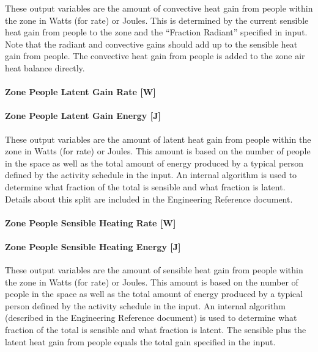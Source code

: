 These output variables are the amount of convective heat gain from people within the zone in Watts (for rate) or Joules. This is determined by the current sensible heat gain from people to the zone and the ``Fraction Radiant'' specified in input. Note that the radiant and convective gains should add up to the sensible heat gain from people. The convective heat gain from people is added to the zone air heat balance directly.

\paragraph{Zone People Latent Gain Rate {[}W{]}}\label{zone-people-latent-gain-rate-w}

\paragraph{Zone People Latent Gain Energy {[}J{]}}\label{zone-people-latent-gain-energy-j}

These output variables are the amount of latent heat gain from people within the zone in Watts (for rate) or Joules. This amount is based on the number of people in the space as well as the total amount of energy produced by a typical person defined by the activity schedule in the input. An internal algorithm is used to determine what fraction of the total is sensible and what fraction is latent. Details about this split are included in the Engineering Reference document.

\paragraph{Zone People Sensible Heating Rate {[}W{]}}\label{zone-people-sensible-heating-rate-w}

\paragraph{Zone People Sensible Heating Energy {[}J{]}}\label{zone-people-sensible-heating-energy-j}

These output variables are the amount of sensible heat gain from people within the zone in Watts (for rate) or Joules. This amount is based on the number of people in the space as well as the total amount of energy produced by a typical person defined by the activity schedule in the input. An internal algorithm (described in the Engineering Reference document) is used to determine what fraction of the total is sensible and what fraction is latent. The sensible plus the latent heat gain from people equals the total gain specified in the input.

